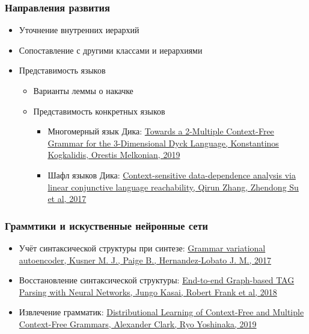 \documentclass{beamer}
\begin{document}
\begin{frame}[fragile]

  \frametitle{Направления развития}

  \begin{itemize}
    \item Уточнение внутренних иерархий
    \item Сопоставление с другими классами и иерархиями
    \item Представимость языков
    \begin{itemize}
      \item Варианты леммы о накачке
      \item Представимость конкретных языков
      \begin{itemize}
        \item Многомерный язык Дика: \href{https://link.springer.com/chapter/10.1007/978-3-662-59620-3_5}{Towards a 2-Multiple Context-Free Grammar for the 3-Dimensional Dyck Language, Konstantinos Kogkalidis, Orestis Melkonian, 2019}
        \item Шафл языков Дика: \href{https://dl.acm.org/doi/10.1145/3093333.3009848}{Context-sensitive data-dependence analysis via linear conjunctive language reachability, Qirun Zhang, Zhendong Su et al, 2017}
      \end{itemize}
    \end{itemize}
  \end{itemize}

\end{frame}

\begin{frame}[fragile]

  \frametitle{Граммтики и искуственные нейронные сети}

\begin{itemize}
    \item Учёт синтаксической структуры при синтезе: \href{https://dl.acm.org/doi/10.5555/3305381.3305582}{Grammar variational autoencoder, Kusner M. J., Paige B., Hernandez-Lobato J. M., 2017}
    \item Восстановление синтаксической структуры: \href{https://arxiv.org/abs/1804.06610}{End-to-end Graph-based TAG Parsing with Neural Networks, Jungo Kasai, Robert Frank et al, 2018}
    \item Извлечение грамматик: \href{https://link.springer.com/chapter/10.1007/978-3-662-48395-4_6}{Distributional Learning of Context-Free and Multiple Context-Free Grammars, Alexander Clark, Ryo Yoshinaka, 2019}
  \end{itemize}


\end{frame}
\end{document}
